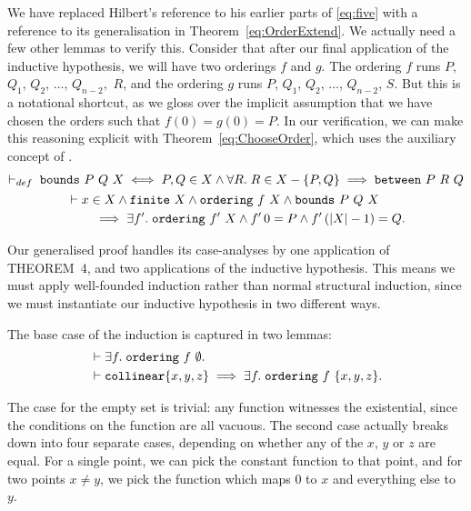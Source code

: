 We have replaced Hilbert's reference to his earlier parts of \ref{eq:five} with a reference to its generalisation in Theorem~\ref{eq:OrderExtend}. We actually need a few other lemmas to verify this. Consider that after our final application of the inductive hypothesis, we will have two orderings $f$ and $g$. The ordering $f$ runs $P,$ $Q_1$, $Q_2$, $\ldots$, $Q_{n-2},$ $R$, and the ordering $g$ runs $P$, $Q_1$, $Q_2$, $\ldots$, $Q_{n-2}$, $S$. But this is a notational shortcut, as we gloss over the implicit assumption that we have chosen the orders such that $f(0) = g(0) = P$. In our verification, we can make this reasoning explicit with Theorem~\ref{eq:ChooseOrder}, which uses the auxiliary concept of .
\begin{gather}
  \vdash_{def}\; \code{bounds}\ P\ Q\ X \iff P,Q \in X \wedge \forall R.\; R \in X - \{P,Q\} \implies \between{P}{R}{Q}\notag\\
  \begin{aligned}  \label{eq:ChooseOrder}
    &\vdash x \in X \wedge \code{finite}\ X \wedge \code{ordering}\ f\ X \wedge \code{bounds}\ P\ Q\ X\\
    &\qquad\implies\exists f'.\; \code{ordering}\ f'\ X \wedge f'\,0 = P \wedge f'\,(|X| - 1) = Q.
  \end{aligned}
\end{gather}

Our generalised proof handles its case-analyses by one application of THEOREM~4, and two applications of the inductive hypothesis. This means we must apply well-founded induction rather than normal structural induction, since we must instantiate our inductive hypothesis in two different ways. 

The base case of the induction is captured in two lemmas:
\begin{displaymath}
  \begin{aligned}
    &\vdash \exists f.\; \texttt{ordering}\ f\ \emptyset.\\
    &\vdash \texttt{collinear} \{x,y,z\} \implies \exists f.\; \texttt{ordering}\ f\ \{x,y,z\}.
  \end{aligned}
\end{displaymath}

The case for the empty set is trivial: any function witnesses the existential, since the conditions on the function are all vacuous. The second case actually breaks down into four separate cases, depending on whether any of the $x$, $y$ or $z$ are equal. For a single point, we can pick the constant function to that point, and for two points $x \neq y$, we pick the function which maps $0$ to $x$ and everything else to $y$.

